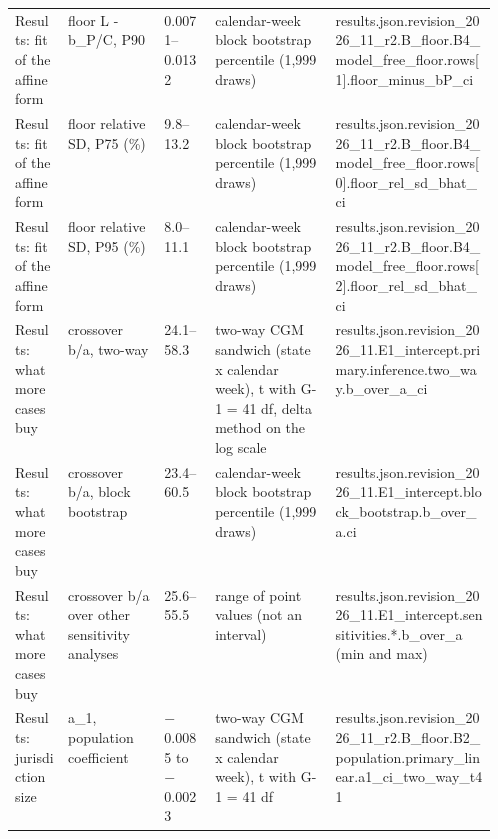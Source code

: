 \begin{table}[!tbp]
\begin{tabularx}{\linewidth}{@{}p{0.11\linewidth}p{0.2\linewidth}lp{0.25\linewidth}X@{}}
Results: fit of the affine form & floor L - b\_P/C, P90 & 0.0071--0.0132 & calendar-week block bootstrap percentile (1,999 draws) & {\ttfamily\tiny results.\allowbreak{}json.\allowbreak{}revision\_2026\_11\_r2.\allowbreak{}B\_floor.\allowbreak{}B4\_model\_free\_floor.\allowbreak{}rows\allowbreak{}[1].\allowbreak{}floor\_minus\_bP\_ci} \\
Results: fit of the affine form & floor relative SD, P75 (\%) & 9.8--13.2 & calendar-week block bootstrap percentile (1,999 draws) & {\ttfamily\tiny results.\allowbreak{}json.\allowbreak{}revision\_2026\_11\_r2.\allowbreak{}B\_floor.\allowbreak{}B4\_model\_free\_floor.\allowbreak{}rows\allowbreak{}[0].\allowbreak{}floor\_rel\_sd\_bhat\_ci} \\
Results: fit of the affine form & floor relative SD, P95 (\%) & 8.0--11.1 & calendar-week block bootstrap percentile (1,999 draws) & {\ttfamily\tiny results.\allowbreak{}json.\allowbreak{}revision\_2026\_11\_r2.\allowbreak{}B\_floor.\allowbreak{}B4\_model\_free\_floor.\allowbreak{}rows\allowbreak{}[2].\allowbreak{}floor\_rel\_sd\_bhat\_ci} \\
Results: what more cases buy & crossover b/a, two-way & 24.1--58.3 & two-way CGM sandwich (state x calendar week), t with G-1 = 41 df, delta method on the log scale & {\ttfamily\tiny results.\allowbreak{}json.\allowbreak{}revision\_2026\_11.\allowbreak{}E1\_intercept.\allowbreak{}primary.\allowbreak{}inference.\allowbreak{}two\_way.\allowbreak{}b\_over\_a\_ci} \\
Results: what more cases buy & crossover b/a, block bootstrap & 23.4--60.5 & calendar-week block bootstrap percentile (1,999 draws) & {\ttfamily\tiny results.\allowbreak{}json.\allowbreak{}revision\_2026\_11.\allowbreak{}E1\_intercept.\allowbreak{}block\_bootstrap.\allowbreak{}b\_over\_a.\allowbreak{}ci} \\
Results: what more cases buy & crossover b/a over other sensitivity analyses & 25.6--55.5 & range of point values (not an interval) & {\ttfamily\tiny results.\allowbreak{}json.\allowbreak{}revision\_2026\_11.\allowbreak{}E1\_intercept.\allowbreak{}sensitivities.\allowbreak{}*.\allowbreak{}b\_over\_a (min and max)} \\
Results: jurisdiction size & a\_1, population coefficient & $-$0.0085 to $-$0.0023 & two-way CGM sandwich (state x calendar week), t with G-1 = 41 df & {\ttfamily\tiny results.\allowbreak{}json.\allowbreak{}revision\_2026\_11\_r2.\allowbreak{}B\_floor.\allowbreak{}B2\_population.\allowbreak{}primary\_linear.\allowbreak{}a1\_ci\_two\_way\_t41} \\

\end{tabularx}
\end{table}
